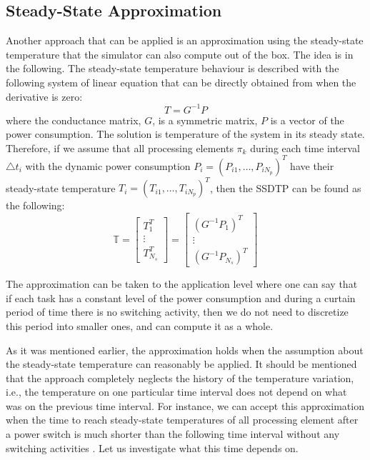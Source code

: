 \subsection{Steady-State Approximation}
Another approach that can be applied is an approximation using the steady-state temperature \cite{huang2009} that the simulator can also compute out of the box. The idea is in the following. The steady-state temperature behaviour is described with the following system of linear equation that can be directly obtained from  when the derivative is zero:
\[
  T = G^{-1} P
\]
where the conductance matrix, $G$, is a symmetric matrix, $P$ is a vector of the power consumption. The solution is temperature of the system in its steady state. Therefore, if we assume that all processing elements $\pi_k$ during each time interval $\triangle t_i$ with the dynamic power consumption $P_i = ( P_{i1}, \dots, P_{i N_p } )^T$ have their steady-state temperature $T_i = ( T_{i1}, \dots, T_{i N_p} )^T$, then the SSDTP can be found as the following:
\begin{equation*}
  \mathbb{T} = \left[
    \begin{array}{c}
      T_1^T \\
      \vdots \\
      T_{N_s}^T
    \end{array}
  \right] = \left[
    \begin{array}{c}
      (G^{-1} P_1)^T \\
      \vdots \\
      (G^{-1} P_{N_s})^T
    \end{array}
  \right]
\end{equation*}

The approximation can be taken to the application level where one can say that if each task has a constant level of the power consumption and during a curtain period of time there is no switching activity, then we do not need to discretize this period into smaller ones, and can compute it as a whole.

As it was mentioned earlier, the approximation holds when the assumption about the steady-state temperature can reasonably be applied. It should be mentioned that the approach completely neglects the history of the temperature variation, i.e., the temperature on one particular time interval does not depend on what was on the previous time interval. For instance, we can accept this approximation when the time to reach steady-state temperatures of all processing element after a power switch is much shorter than the following time interval without any switching activities \cite{huang2009}. Let us investigate what this time depends on.

